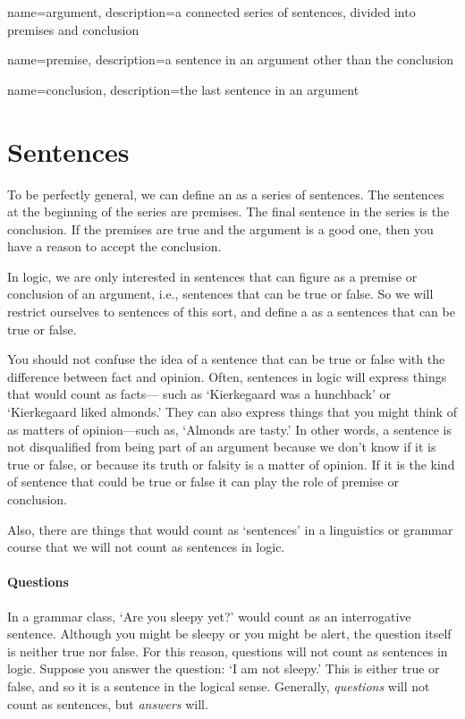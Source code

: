 {
name=argument,
description={a connected series of sentences, divided into \gls{premise}s and \gls{conclusion}}
}

{
name=premise,
description={a sentence in an \gls{argument} other than the \gls{conclusion}}
}

{
name=conclusion,
description={the last sentence in an \gls{argument}}
}


\section{Sentences}
\label{intro.sentences}

To be perfectly general, we can define an  as a series of sentences. The sentences at the beginning of the series are premises. The final sentence in the series is the conclusion. If the premises are true and the argument is a good one, then you have a reason to accept the conclusion.

In logic, we are only interested in sentences that can figure as a premise or conclusion of an argument, i.e., sentences that can be true or false.  So we will restrict ourselves to sentences of this sort, and define a  as a sentences that can be true or false.

You should not confuse the idea of a sentence that can be true or false with the difference between fact and opinion. Often, sentences in logic will express things that would count as facts--- such as `Kierkegaard was a hunchback' or `Kierkegaard liked almonds.' They can also express things that you might think of as matters of opinion---such as, `Almonds are tasty.' In other words, a sentence is not disqualified from being part of an argument because we don't know if it is true or false, or because its truth or falsity is a matter of opinion. If it is the kind of sentence that could be true or false it can play the role of premise or conclusion.

Also, there are things that would count as `sentences' in a linguistics or grammar course that we will not count as sentences in logic.

\paragraph{Questions} In a grammar class, `Are you sleepy yet?' would count as an interrogative sentence. Although you might be sleepy or you might be alert, the question itself is neither true nor false. For this reason, questions will not count as sentences in logic. Suppose you answer the question: `I am not sleepy.' This is either true or false, and so it is a sentence in the logical sense. Generally, \emph{questions} will not count as sentences, but \emph{answers} will. 

